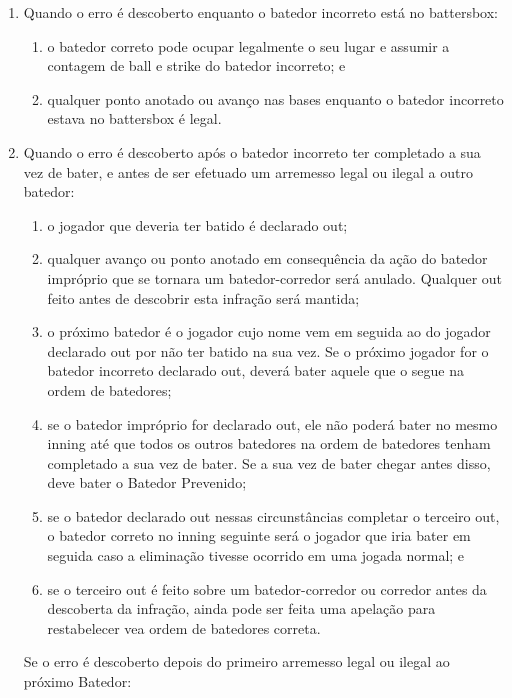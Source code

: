 \begin{enumerate}[label=(\alph*)]
	\item   Quando o erro é descoberto enquanto o batedor incorreto está no \gls{battersbox}:

	\begin{enumerate}[label=\roman*.]
		\item o batedor correto pode ocupar legalmente o seu lugar e assumir a contagem de \gls{ball} e \gls{strike} do batedor incorreto; e
		\item qualquer ponto anotado ou avanço nas bases enquanto o batedor incorreto estava no \gls{battersbox} é legal.
	\end{enumerate}

	\item  Quando o erro é descoberto após o batedor incorreto ter completado a sua  vez de bater, e antes de ser efetuado um arremesso legal ou ilegal a outro batedor:
	\begin{enumerate}[label=\roman*.]
		\item  o jogador que deveria ter batido é declarado \gls{out};
		\item  qualquer avanço ou ponto anotado em consequência da ação do batedor impróprio que se tornara um batedor-corredor será anulado. Qualquer \gls{out} feito antes de descobrir esta infração será mantida;
		\item  o próximo batedor é o jogador cujo nome vem em seguida ao do jogador declarado \gls{out} por não ter batido na sua vez. Se o próximo jogador for o batedor incorreto declarado \gls{out}, deverá bater aquele que o segue na ordem de batedores;
		\item  se o batedor impróprio for declarado \gls{out}, ele não poderá bater no mesmo \gls{inning} até que todos os outros batedores na ordem de batedores tenham  completado a sua vez de bater. Se a sua vez de bater chegar antes disso, deve bater o Batedor Prevenido;
		\item  se o batedor declarado \gls{out} nessas circunstâncias completar o terceiro \gls{out}, o batedor correto no \gls{inning} seguinte será o jogador que iria bater em seguida caso a eliminação tivesse ocorrido em uma jogada normal; e
		\item  se o terceiro \gls{out} é feito sobre um batedor-corredor ou corredor antes da descoberta da infração, ainda pode ser feita uma apelação para restabelecer   vea ordem de batedores correta.
	\end{enumerate}

	Se o erro é descoberto depois do primeiro arremesso legal ou ilegal ao próximo Batedor:


\end{enumerate}
